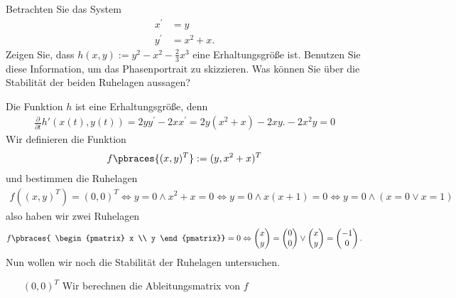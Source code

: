 \begin{exercise}
Betrachten Sie das System
\begin{align*}
  x^{\prime} &= y \\
  y^{\prime} &= x^2 + x.
\end{align*}
Zeigen Sie, dass $h(x,y) := y^2 - x^2 -\frac{2}{3}x^3$ eine Erhaltungsgröße ist.
Benutzen Sie diese Information, um das Phasenportrait zu skizzieren.
Was können Sie über die Stabilität der beiden Ruhelagen aussagen?
\end{exercise}
\begin{solution}
  Die Funktion $h$ ist eine Erhaltungsgröße, denn
  \begin{align*}
      \frac{\partial}{\partial t}h\prime(x(t), y(t)) = 2yy^\prime - 2xx^\prime = 2y(x^2 + x) - 2xy. -2x^2y = 0
  \end{align*}
  Wir definieren die Funktion
  \begin{align*}
    f\pbraces{(x, y)^T} := (y, x^2 + x)^T
  \end{align*}
  und bestimmen die Ruhelagen
  \begin{align*}
    f((x,y)^T) = (0, 0)^T \Leftrightarrow y = 0 \land x^2 + x = 0 \Leftrightarrow y = 0 \land x(x + 1) = 0 \Leftrightarrow y = 0 \land (x = 0 \lor x = 1)
  \end{align*}
  also haben wir zwei Ruhelagen
  \begin{align*}
    f \pbraces{
    \begin{pmatrix}
      x \\ y
    \end{pmatrix}}
    = 0 \Leftrightarrow
    \begin{pmatrix}
      x \\ y
    \end{pmatrix}
    =
    \begin{pmatrix}
      0 \\ 0
    \end{pmatrix}
    \lor
    \begin{pmatrix}
      x \\ y
    \end{pmatrix}
    =
    \begin{pmatrix}
      -1 \\ 0
    \end{pmatrix}.
  \end{align*}
  Nun wollen wir noch die Stabilität der Ruhelagen untersuchen.
  \begin{enumerate}
    \item[\glqq$(0, 0)^T$\grqq] Wir berechnen die Ableitungsmatrix von $f$

\end{enumerate}
\end{solution}
